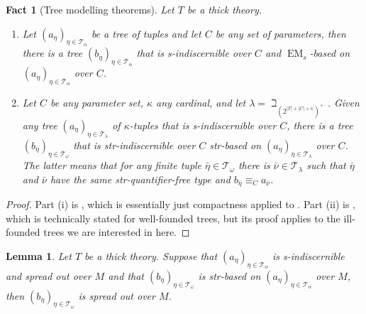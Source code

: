 \documentclass[a4paper, reqno]{amsart}
\newtheorem{lemma}[theorem]{Lemma}
\newtheorem{fact}[theorem]{Fact}
\theoremstyle{definition}
\theoremstyle{repeat}
\newcommand{\T}{\mathcal{T}}
\DeclareMathOperator{\EM}{EM}
\begin{document}
\begin{fact}[Tree modelling theorems]
Let $T$ be a thick theory.
\begin{enumerate}[label=(\roman*)]
\item Let $(a_\eta)_{\eta \in \T_\alpha}$ be a tree of tuples and let $C$ be any set of parameters, then there is a tree $(b_\eta)_{\eta \in \T_\alpha}$ that is s-indiscernible over $C$ and $\EM_s$-based on $(a_\eta)_{\eta \in \T_\alpha}$ over $C$.
\item Let $C$ be any parameter set, $\kappa$ any cardinal, and let $\lambda = \beth_{(2^{|T| + |C| + \kappa})^+}$. Given any tree $(a_\eta)_{\eta \in \T_\lambda}$ of $\kappa$-tuples that is s-indiscernible over $C$, there is a tree $(b_\eta)_{\eta \in \T_\omega}$ that is str-indiscernible over $C$ str-based on $(a_\eta)_{\eta \in \T_\lambda}$ over $C$. The latter means that for any finite tuple $\bar{\eta} \in \T_\omega$ there is $\bar{\nu} \in \T_\lambda$ such that $\bar{\eta}$ and $\bar{\nu}$ have the same str-quantifier-free type and $b_{\bar{\eta}} \equiv_C a_{\bar{\nu}}$.
\end{enumerate}
\end{fact}
\begin{proof}
Part (i) is \cite[Theorem 4.6]{kamsma_positive_2023}, which is essentially just compactness applied to \cite[Proposition 5.8]{dobrowolski_kim-independence_2022}. Part (ii) is \cite[Theorem 4.8]{kamsma_positive_2023}, which is technically stated for well-founded trees, but its proof applies to the ill-founded trees we are interested in here.
\end{proof}
\begin{lemma}
Let $T$ be a thick theory. Suppose that $(a_\eta)_{\eta \in \T_\alpha}$ is s-indiscernible and spread out over $M$ and that $(b_\eta)_{\eta \in \T_\omega}$ is str-based on $(a_\eta)_{\eta \in \T_\alpha}$ over $M$, then $(b_\eta)_{\eta \in \T_\omega}$ is spread out over $M$.
\end{lemma}
\end{document}
